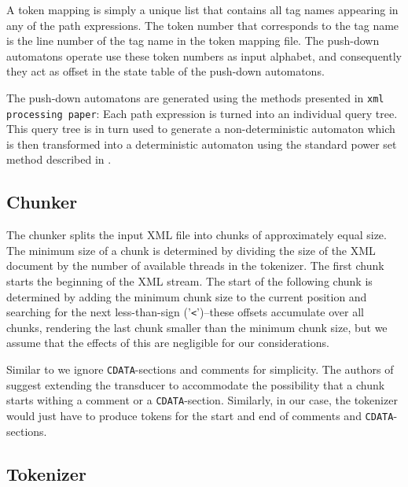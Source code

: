 A token mapping is simply a unique list that contains all tag names appearing in
any of the path expressions. The token number that corresponds to the tag name
is the line number of the tag name in the token mapping file. The push-down
automatons operate use these token numbers as input alphabet, and consequently
they act as offset in the state table of the push-down automatons.

The push-down automatons are generated using the methods presented in
\texttt{xml processing paper}: Each path expression is turned into an individual
query tree. This query tree is in turn used to generate a non-deterministic
automaton which is then transformed into a deterministic automaton using
the standard power set method described in .

\subsection{Chunker}

The chunker splits the input XML file into chunks of approximately equal size.
The minimum size of a chunk is determined by dividing the size of the XML
document by the number of available threads in the tokenizer. The first chunk
starts the beginning of the XML stream. The start of the following chunk is
determined by adding the minimum chunk size to the current position and
searching for the next less-than-sign ('\texttt{<}')–these offsets accumulate over
all chunks, rendering the last chunk smaller than the minimum chunk size, but we
assume that the effects of this are negligible for our considerations.

Similar to  we ignore \texttt{CDATA}-sections and comments for
simplicity. The authors of  suggest extending the transducer to
accommodate the possibility that a chunk starts withing a comment or a
\texttt{CDATA}-section. Similarly, in our case, the tokenizer would just have to
produce tokens for the start and end of comments and \texttt{CDATA}-sections.

\subsection{Tokenizer}





